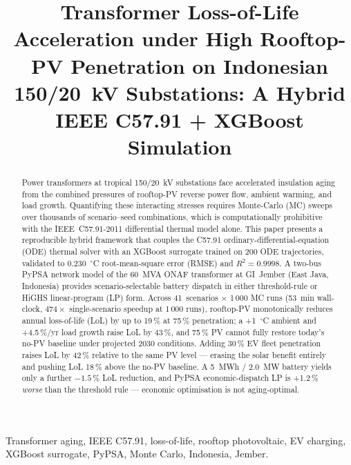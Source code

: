 \documentclass[conference]{IEEEtran}
\begin{document}
\title{Transformer Loss-of-Life Acceleration under High Rooftop-PV Penetration on Indonesian 150/20~kV Substations: A Hybrid IEEE C57.91 + XGBoost Simulation}

\author{
}

\maketitle

\begin{abstract}
Power transformers at tropical 150/20~kV substations face accelerated insulation aging from the combined pressures of rooftop-PV reverse power flow, ambient warming, and load growth. Quantifying these interacting stresses requires Monte-Carlo (MC) sweeps over thousands of scenario--seed combinations, which is computationally prohibitive with the IEEE~C57.91-2011 differential thermal model alone. This paper presents a reproducible hybrid framework that couples the C57.91 ordinary-differential-equation (ODE) thermal solver with an XGBoost surrogate trained on 200 ODE trajectories, validated to 0.230~$^\circ$C root-mean-square error (RMSE) and $R^2 = 0.9998$. A two-bus PyPSA network model of the 60~MVA ONAF transformer at GI~Jember (East Java, Indonesia) provides scenario-selectable battery dispatch in either threshold-rule or HiGHS linear-program (LP) form. Across 41~scenarios $\times$ 1\,000 MC runs (53~min wall-clock, $474\times$ single-scenario speedup at 1\,000 runs), rooftop-PV monotonically reduces annual loss-of-life (LoL) by up to 19\,\% at 75\,\% penetration; a +1~$^\circ$C ambient and +4.5\,\%/yr load growth raise LoL by 43\,\%, and 75\,\% PV cannot fully restore today's no-PV baseline under projected 2030 conditions. Adding 30\,\% EV fleet penetration raises LoL by 42\,\% relative to the same PV level --- erasing the solar benefit entirely and pushing LoL 18\,\% above the no-PV baseline. A 5~MWh / 2.0~MW battery yields only a further $-1.5\,\%$ LoL reduction, and PyPSA economic-dispatch LP is +1.2\,\% \emph{worse} than the threshold rule --- economic optimisation is not aging-optimal.
\end{abstract}

\begin{IEEEkeywords}
Transformer aging, IEEE C57.91, loss-of-life, rooftop photovoltaic, EV charging, XGBoost surrogate, PyPSA, Monte Carlo, Indonesia, Jember.
\end{IEEEkeywords}
\end{document}
